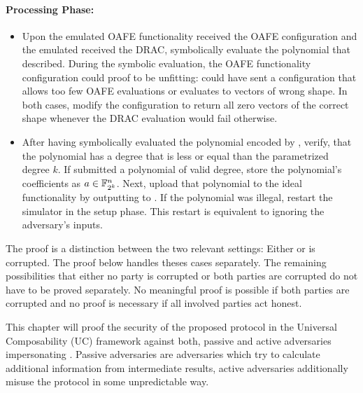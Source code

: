 \paragraph{Processing Phase:}

\begin{itemize}

  \item Upon the emulated OAFE functionality received the OAFE configuration and
    the emulated \JWpTwo{} received the DRAC, symbolically evaluate the
    polynomial that \JWadv{} described. During the symbolic evaluation, the OAFE
    functionality configuration could proof to be unfitting: \JWadv{} could
    have sent a configuration that allows too few OAFE evaluations or evaluates
    to vectors of wrong shape. In both cases, modify the configuration to return
    all zero vectors of the correct shape whenever the DRAC evaluation would
    fail otherwise.

  \item After having symbolically evaluated the polynomial encoded by \JWadv{},
    verify, that the polynomial has a degree that is less or equal than the
    parametrized degree $k$. If \JWadv{} submitted a polynomial of valid degree,
    store the polynomial's coefficients as $a \in \mathbb{F}_{2^k}^n$.  Next,
    upload that polynomial to the ideal functionality \JWfuncSymOPEnp{} by
    outputting  to \JWfuncSymOPEnp{}.  If the polynomial
    was illegal, restart the simulator in the setup phase.  This restart is
    equivalent to ignoring the adversary's inputs.

\end{itemize}


%
%
\label{sec:proof}

The proof is a distinction between the two relevant settings: Either \JWpOne{}
or \JWpTwo{} is corrupted. The proof below handles theses cases separately. The
remaining possibilities that either no party is corrupted or both parties are
corrupted do not have to be proved separately. No meaningful proof is possible
if both parties are corrupted and no proof is necessary if all involved parties
act honest.



This chapter will proof the security of the proposed protocol \JWprotoSymOPE
in the Universal Composability (UC) framework \cite{canetti05} against both,
passive and active adversaries impersonating \JWpTwo{}. Passive adversaries are
adversaries which try to calculate additional information from intermediate
results, active adversaries additionally misuse the protocol in some
unpredictable way.

